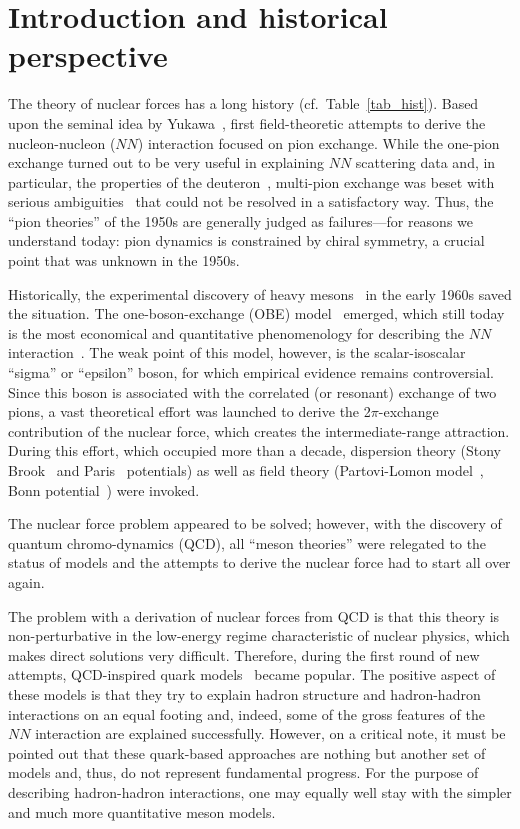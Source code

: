 \documentclass[sort&compress,preprint,3p]{elsarticle}
\begin{document}
\tableofcontents


\newpage

\section{Introduction and historical perspective} 

The theory of nuclear forces has a long history (cf.\ Table~\ref{tab_hist}).
Based upon the seminal idea by Yukawa~\cite{Yuk35}, 
first field-theoretic attempts
to derive the nucleon-nucleon ($NN$) interaction
focused on pion exchange.
While the one-pion exchange turned out to be very useful
in explaining $NN$ scattering data and, in particular, the properties
of the deuteron~\cite{Sup56}, 
multi-pion exchange was beset with
serious ambiguities~\cite{TMO52,BW53}
that could not be resolved in a satisfactory way.
Thus, the ``pion theories'' of the 1950s
are generally judged as failures---for reasons
we understand today: pion dynamics is constrained by chiral
symmetry, a crucial point that was unknown in the 1950s.

Historically, the experimental discovery of heavy 
mesons~\cite{Erw61} in the early 1960s
saved the situation. The one-boson-exchange (OBE)
model~\cite{Sup67,BS64,Erk74,HM75,NRS78,Mac89} emerged, which still today is the most economical
and quantitative
phenomenology for describing the 
$NN$ interaction~\cite{Sto94,Mac01,GS08}.
The weak point of this model, however, is the scalar-isoscalar
``sigma'' or ``epsilon'' boson, for which empirical
evidence remains controversial. Since this boson is associated
with the  correlated (or resonant) exchange of two pions,
a vast theoretical effort 
was launched to derive the 2$\pi$-exchange contribution
of the nuclear force, which creates the intermediate-range attraction.
During this effort, which occupied more than a decade,
dispersion theory 
(Stony Brook~\cite{JRV75,BJ76} and Paris~\cite{Vin79,Lac80} potentials) 
as well as field theory 
(Partovi-Lomon model~\cite{PL70}, Bonn potential~\cite{Mac89,MHE87})
were invoked.

The nuclear force problem appeared to be solved; however,
with the discovery of quantum chromo-dynamics (QCD), 
all ``meson theories'' were
relegated to the status of models and the attempts to derive
the nuclear force had to start all over again.

The problem with a derivation of nuclear forces from QCD is that
this theory is non-perturbative in the low-energy regime
characteristic of nuclear physics, which makes direct solutions
very difficult.
Therefore, during the first round of new attempts, QCD-inspired quark 
models~\cite{Tar80,Har81,OY81,Fae83,Tho83,MW88,TSY89,Bar93,EFV00,Wu00,Dow10} 
became popular. 
The positive aspect of these models is that they try to explain hadron structure
and hadron-hadron interactions on an equal footing and, indeed, 
some of the gross features of the $NN$ interaction are explained successfully.
However, on a critical note, it must be pointed out
that these quark-based
approaches are nothing but
another set of models and, thus, do not represent
fundamental progress. 
For the purpose of describing hadron-hadron interactions, 
one may equally well stay
with the simpler and much more quantitative meson models.
\end{document}
